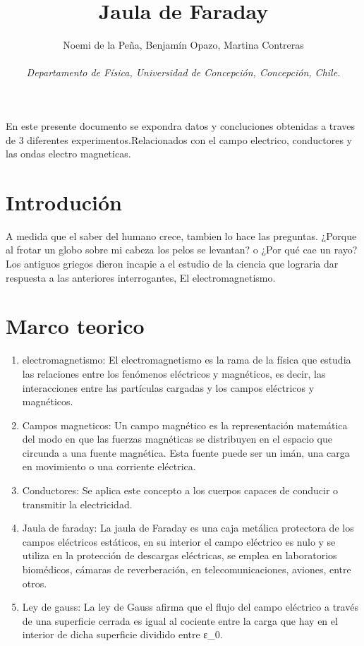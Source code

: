 \documentclass[a4paper,12pt]{article}
\title{Jaula de Faraday}
\author{Noemi de la Peña, Benjamín Opazo, Martina Contreras \\ \\
 \textit{ Departamento de Física, Universidad de Concepción, Concepción, Chile. }}
\date{}
\begin{document}
\maketitle 



En este presente documento se expondra datos y concluciones 
obtenidas a traves de 3 diferentes experimentos.Relacionados con el campo electrico,
conductores y las ondas electro magneticas.



\section*{Introdución}
    A medida que el saber del humano crece, tambien lo hace las preguntas.
    ¿Porque al frotar un globo sobre mi cabeza los pelos se levantan? o 
    ¿Por qué cae un rayo?
    Los antiguos griegos dieron incapie a el estudio de la ciencia que 
    lograria dar respuesta a las anteriores interrogantes, El electromagnetismo.
\section*{Marco teorico}
\begin{enumerate}
    \item electromagnetismo: El electromagnetismo es la rama de la física que estudia las relaciones entre los fenómenos eléctricos y magnéticos, es decir, las interacciones entre las partículas cargadas y los campos eléctricos y magnéticos.
    
    \item Campos magneticos: Un campo magnético es la representación matemática del modo en que las fuerzas magnéticas se distribuyen en el espacio que circunda a una fuente magnética. Esta fuente puede ser un imán, una carga en movimiento o una corriente eléctrica.
    
    \item Conductores: Se aplica este concepto a los cuerpos capaces de conducir o transmitir la electricidad.
    
    \item Jaula de faraday: La jaula de Faraday es una caja metálica protectora de los campos eléctricos estáticos, en su interior el campo eléctrico es nulo y se utiliza en la protección de descargas eléctricas, se emplea en laboratorios biomédicos, cámaras de reverberación, en telecomunicaciones, aviones, entre otros.
    
    \item Ley de gauss: La ley de Gauss afirma que el flujo del campo eléctrico a través de una superficie cerrada es igual al cociente entre la carga que hay en el interior de dicha superficie dividido entre ε_0.
\end{enumerate}
\end{document}
